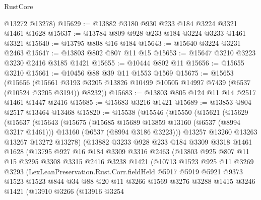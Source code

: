 \begin{lexlean}{RustCore}
\begin{coremodule}
      @13272
      @13278)
@15629 := @13882 @3180 @930 @233 @184 @3224 @3321 @1461 @1628
@15637 := @13784 @809 @928 @233 @184 @3224 @3233 @1461 @3321
@15640 := @13795 @808 @16 @184
@15643 := @15640 @3224 @3231 @2463
@15647 := @13803 @802 @807 @11 @15
@15653 := @15647 @3210 @3223 @3230 @2416 @3185 @1421
@15655 := @10444 @802 @11
@15656 := @15655 @3210
@15661 := @10456 @88 @39 @11 @1553 @1569
@15675 := @15653
    (@15656
      (@15661 @3193 @3205 @13826 @10499 @10505 @14997 @7439 (@6537 (@10524 @3205 @3194)) @8232))
@15683 := @13803 @805 @124 @11 @14 @2517 @1461 @1447 @2416
@15685 := @15683 @3216 @1421
@15689 := @13853 @804 @2517 @13464 @13468
@15820 := @15538
    (@15546
      (@15550
        (@15621
          (@15629
            (@15637
              (@15643
                (@15675
                  (@15685 @15689 @13859 @13160 (@6537 (@8994 @3217 @1461)))
                  @13160
                  (@6537 (@8994 @3186 @3223)))
                @13257
                @13260
                @13263
                @13267
                @13272
                @13278)
              (@13882
                @3233
                @928
                @233
                @184
                @3309
                @3318
                @1461
                @1628
                (@13795
                  @927
                  @16
                  @184
                  @3309
                  @3316
                  @2463
                  (@13803
                    @925
                    @807
                    @11
                    @15
                    @3295
                    @3308
                    @3315
                    @2416
                    @3238
                    @1421
                    (@10713
                      @1523
                      @925
                      @11
                      @3269
                      @3293
                      (LexLeanPreservation.Rust.Corr.fieldHeld
                        @5917
                        @5919
                        @5921
                        @9373
                        @1523
                        @1523
                        @844
                        @34
                        @88
                        @20
                        @11
                        @3266
                        @1569
                        @3276
                        @3288
                        @1415
                        @3246
                        @1421
                        (@13910
                          @3266
                          (@13916
                            @3254

\end{coremodule}
\end{lexlean}

